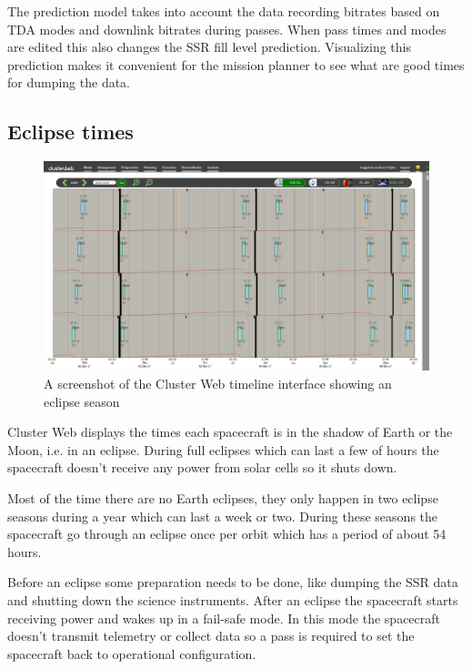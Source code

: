 The prediction model takes into account the data recording bitrates based on TDA modes and downlink bitrates during passes. When pass times and modes are edited this also changes the SSR fill level prediction. Visualizing this prediction makes it convenient for the mission planner to see what are good times for dumping the data.

\subsection{Eclipse times}

\begin{figure}[ht]
  \begin{center}
    \includegraphics*[width=1\textwidth]{clusterweb_eclipses}
  \end{center}
  \caption{A screenshot of the Cluster Web timeline interface showing an eclipse season}
  \label{fig:clusterweb_eclipses}
\end{figure}

Cluster Web displays the times each spacecraft is in the shadow of Earth or the Moon, i.e. in an eclipse. During full eclipses which can last a few of hours the spacecraft doesn't receive any power from solar cells so it shuts down.

Most of the time there are no Earth eclipses, they only happen in two eclipse seasons during a year which can last a week or two. During these seasons the spacecraft go through an eclipse once per orbit which has a period of about 54 hours.

Before an eclipse some preparation needs to be done, like dumping the SSR data and shutting down the science instruments. After an eclipse the spacecraft starts receiving power and wakes up in a fail-safe mode. In this mode the spacecraft doesn't transmit telemetry or collect data so a pass is required to set the spacecraft back to operational configuration.


